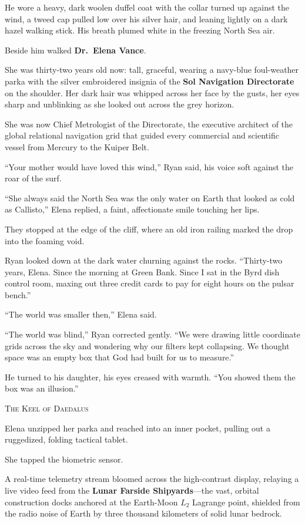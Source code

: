 \documentclass[12pt,twoside,openright]{book}
\newcommand{\sceneheader}[1]{%
  \par\vspace{1.8em}%
  {\noindent\centering\scshape\large #1\par}%
  \vspace{1.0em}%
  \noindent%
}
\newcommand{\dinkus}{%
  \par\vspace{1.2em}%
  {\noindent\centering{\large $\ast\quad\ast\quad\ast$}\par}%
  \vspace{1.2em}%
  \noindent%
}
\begin{document}
He wore a heavy, dark woolen duffel coat with the collar turned up
against the wind, a tweed cap pulled low over his silver hair, and
leaning lightly on a dark hazel walking stick. His breath plumed white
in the freezing North Sea air.

Beside him walked \textbf{Dr.~Elena Vance}.

She was thirty-two years old now: tall, graceful, wearing a navy-blue
foul-weather parka with the silver embroidered insignia of the
\textbf{Sol Navigation Directorate} on the shoulder. Her dark hair was
whipped across her face by the gusts, her eyes sharp and unblinking as
she looked out across the grey horizon.

She was now Chief Metrologist of the Directorate, the executive
architect of the global relational navigation grid that guided every
commercial and scientific vessel from Mercury to the Kuiper Belt.

``Your mother would have loved this wind,'' Ryan said, his voice soft
against the roar of the surf.

``She always said the North Sea was the only water on Earth that looked
as cold as Callisto,'' Elena replied, a faint, affectionate smile
touching her lips.

They stopped at the edge of the cliff, where an old iron railing marked
the drop into the foaming void.

Ryan looked down at the dark water churning against the rocks.
``Thirty-two years, Elena. Since the morning at Green Bank. Since I sat
in the Byrd dish control room, maxing out three credit cards to pay for
eight hours on the pulsar bench.''

``The world was smaller then,'' Elena said.

``The world was blind,'' Ryan corrected gently. ``We were drawing little
coordinate grids across the sky and wondering why our filters kept
collapsing. We thought space was an empty box that God had built for us
to measure.''

He turned to his daughter, his eyes creased with warmth. ``You showed
them the box was an illusion.''

\dinkus

\sceneheader{The Keel of Daedalus}

Elena unzipped her parka and reached into an inner pocket, pulling out a
ruggedized, folding tactical tablet.

She tapped the biometric sensor.

A real-time telemetry stream bloomed across the high-contrast display,
relaying a live video feed from the \textbf{Lunar Farside
Shipyards}---the vast, orbital construction docks anchored at the
Earth-Moon \(L_2\) Lagrange point, shielded from the radio noise of
Earth by three thousand kilometers of solid lunar bedrock.
\end{document}
